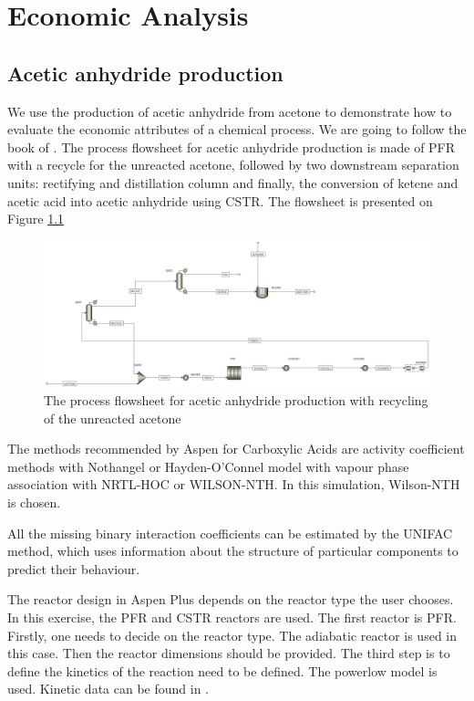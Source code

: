 \chapter{Economic Analysis}

\section{Acetic anhydride production}

	We use the production of acetic anhydride from acetone to demonstrate how to evaluate the economic attributes of a chemical process. We are going to follow the book of \cite{AlMalah2016}. The process flowsheet for acetic anhydride production is made of PFR with a recycle for the unreacted acetone, followed by two downstream separation units: rectifying and distillation column and finally, the conversion of ketene and acetic acid into acetic anhydride using CSTR. The flowsheet is presented on Figure \ref{fig:Acetic_Flowsheet}
	
	\begin{figure}[h!]
		\centering
		\includegraphics[trim= 0cm 0cm 0cm 0cm,clip,width=\textwidth]{Figures/Econmic_Analysis/Flowsheet.jpg}
		\caption{The process flowsheet for acetic anhydride production with recycling of the unreacted acetone}
		\label{fig:Acetic_Flowsheet}
	\end{figure}

	The methods recommended by Aspen for Carboxylic Acids are activity coefficient methods with Nothangel or Hayden-O'Connel model with vapour phase association with NRTL-HOC or WILSON-NTH. In this simulation, Wilson-NTH is chosen. 
	
	All the missing binary interaction coefficients can be estimated by the UNIFAC method, which uses information about the structure of particular components to predict their behaviour. 
	
	The reactor design in Aspen Plus depends on the reactor type the user chooses. In this exercise, the PFR and CSTR reactors are used. The first reactor is PFR. Firstly, one needs to decide on the reactor type. The adiabatic reactor is used in this case. Then the reactor dimensions should be provided. The third step is to define the kinetics of the reaction need to be defined. The powerlow model is used. Kinetic data can be found in \cite{Fogler1974}. 
	
